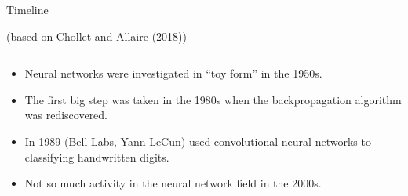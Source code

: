 \documentclass[10pt,ignorenonframetext,]{beamer}
\providecommand{\tightlist}{%
  \setlength{\itemsep}{0pt}\setlength{\parskip}{0pt}}
\begin{document}
\begin{frame}

\begin{block}{Timeline}

(based on Chollet and Allaire (2018))

\(~\)

\begin{itemize}
\tightlist
\item
  Neural networks were investigated in ``toy form'' in the 1950s.
\end{itemize}

\vspace{2mm}

\begin{itemize}
\tightlist
\item
  The first big step was taken in the 1980s when the backpropagation
  algorithm was rediscovered.
\end{itemize}

\vspace{2mm}

\begin{itemize}
\tightlist
\item
  In 1989 (Bell Labs, Yann LeCun) used convolutional neural networks to
  classifying handwritten digits.
\end{itemize}

\vspace{2mm}

\begin{itemize}
\tightlist
\item
  Not so much activity in the neural network field in the 2000s.
\end{itemize}

\end{block}

\end{frame}
\end{document}
